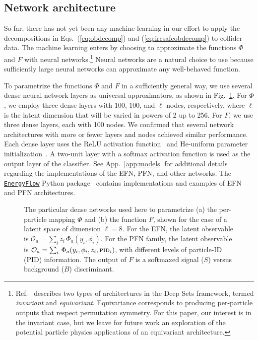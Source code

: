 \documentclass[letterpaper,11pt]{article}
\DeclareRobustCommand{\App}[1]{App.~\ref{#1}}
\DeclareRobustCommand{\Fig}[1]{Fig.~\ref{#1}}
\DeclareRobustCommand{\Eqs}[2]{Eqs.~(\ref{#1}) and (\ref{#2})}
\DeclareRobustCommand{\Ref}[1]{Ref.~\cite{#1}}
\newcommand{\deepsets}{DBLP:conf/nips/ZaheerKRPSS17}
\begin{document}
\subsection{Network architecture}
\label{sec:arch}


So far, there has not yet been any machine learning in our effort to apply the decompositions in \Eqs{eq:obdecomp}{eq:ircsafeobdecomp} to collider data.
%
The machine learning enters by choosing to approximate the functions $\Phi$ and $F$ with neural networks.\footnote{\Ref{\deepsets} describes two types of architectures in the Deep Sets framework, termed \emph{invariant} and \emph{equivariant}. Equivariance corresponds to producing per-particle outputs that respect permutation symmetry. For this paper, our interest is in the invariant case, but we leave for future work an exploration of the potential particle physics applications of an equivariant architecture.}
%
Neural networks are a natural choice to use because sufficiently large neural networks can approximate any well-behaved function.


To parametrize the functions $\Phi$ and $F$ in a sufficiently general way, we use several dense neural network layers as universal approximators, as shown in \Fig{fig:explicitNNs}.
%
For $\Phi$, we employ three dense layers with 100, 100, and $\ell$ nodes, respectively, where $\ell$ is the latent dimension that will be varied in powers of 2 up to 256.
%
For $F$, we use three dense layers, each with 100 nodes.
%
We confirmed that several network architectures with more or fewer layers and nodes achieved similar performance.
%
Each dense layer uses the ReLU activation function~\cite{relu} and He-uniform parameter initialization~\cite{heuniform}.
%
A two-unit layer with a softmax activation function is used as the output layer of the classifier.
%
See \App{app:models} for additional details regarding the implementations of the EFN, PFN, and other networks.
%
The \href{https://energyflow.network}{\tt EnergyFlow} Python package~\cite{energyflow} contains implementations and examples of EFN and PFN architectures.


\begin{figure}[t]
\centering
{}\hspace{10mm}
\caption{\label{fig:explicitNNs}
The particular dense networks used here to parametrize (a) the per-particle mapping $\Phi$ and (b) the function $F$, shown for the case of a latent space of dimension $\ell = 8$.
%
For the EFN, the latent observable is $\mathcal{O}_a = \sum_i z_i \, \Phi_a(y_i, \phi_i)$.
%
For the PFN family, the latent observable is $\mathcal{O}_a = \sum_i \, \Phi_a(y_i, \phi_i, z_i, \textsc{pid}_i)$, with different levels of particle-ID (PID) information.
%
The output of $F$ is a softmaxed signal ($S$) versus background ($B$) discriminant.
}
\end{figure}
\end{document}

